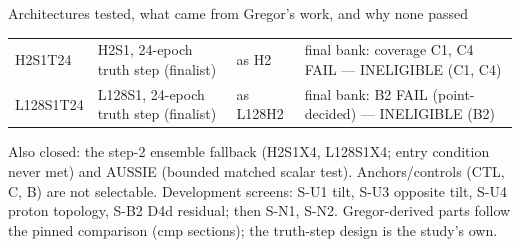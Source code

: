 \documentclass[aspectratio=169,10pt]{beamer}
\begin{document}
\begin{frame}{Architectures tested, what came from Gregor's work, and why none passed}
{\begin{tabular}{llll}
H2S1T24 & H2S1, 24-epoch truth step (finalist) & as H2 & final bank: coverage C1, C4 FAIL --- INELIGIBLE (C1, C4) \\
L128S1T24 & L128S1, 24-epoch truth step (finalist) & as L128H2 & final bank: B2 FAIL (point-decided) --- INELIGIBLE (B2) \\
\bottomrule
\end{tabular}}\par\vspace{0.1cm}\tiny Also closed: the step-2 ensemble fallback (H2S1X4, L128S1X4; entry condition never met) and AUSSIE (bounded matched scalar test). Anchors/controls (CTL, C, B) are not selectable. Development screens: S-U1 tilt, S-U3 opposite tilt, S-U4 proton topology, S-B2 D4d residual; then S-N1, S-N2. Gregor-derived parts follow the pinned comparison (cmp sections); the truth-step design is the study's own.
\end{frame}
\end{document}

